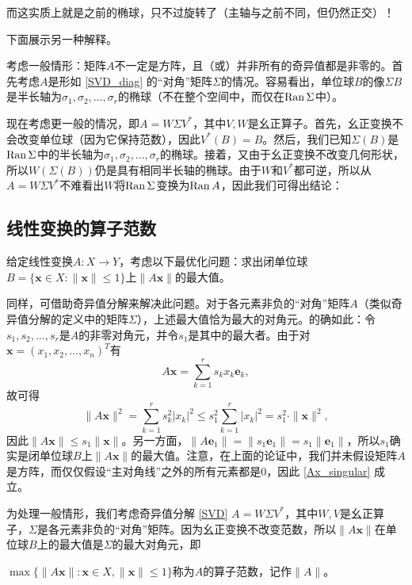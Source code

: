 而这实质上就是之前的椭球，只不过旋转了（主轴与之前不同，但仍然正交）！

下面展示另一种解释。

考虑一般情形：矩阵$A$不一定是方阵，且（或）并非所有的奇异值都是非零的。首先考虑$A$是形如 \eqref{SVD_diag} 的“对角”矩阵$\Sigma$的情况。容易看出，单位球$B$的像$\Sigma B$是半长轴为$\sigma_1,\sigma_2,\dots,\sigma_r$的椭球（不在整个空间中，而仅在$\operatorname{Ran} \Sigma$中）。

现在考虑更一般的情况，即$A=W\Sigma V^*$，其中$V,W$是幺正算子。首先，幺正变换不会改变单位球（因为它保持范数），因此$V^*(B)=B$。然后，我们已知$\Sigma (B)$是$\operatorname{Ran} \Sigma$中的半长轴为$\sigma_1,\sigma_2,\dots,\sigma_r$的椭球。接着，又由于幺正变换不改变几何形状，所以$W(\Sigma(B))$仍是具有相同半长轴的椭球。由于$W$和$V^*$都可逆，所以从$A=W\Sigma V^*$不难看出$W$将$\operatorname{Ran} \Sigma$变换为$\operatorname{Ran} A$，因此我们可得出结论：
\begin{center}
\end{center}

\subsection{线性变换的算子范数}

给定线性变换$A:X\to Y$，考虑以下最优化问题：求出闭单位球$B=\{\mathbf{x}\in X:\|\mathbf{x}\|\le 1\}$上$\|A\mathbf{x}\|$的最大值。

同样，可借助奇异值分解来解决此问题。对于各元素非负的“对角”矩阵$A$（类似奇异值分解的定义中的矩阵$\Sigma$），上述最大值恰为最大的对角元。的确如此：令$s_1,s_2,\ldots,s_r$是$A$的非零对角元，并令$s_1$是其中的最大者。由于对$\mathbf{x}=(x_1,x_2,\ldots,x_n)^T$有
\begin{equation}\label{Ax_singular}
    A\mathbf{x}=\sum_{k=1}^rs_kx_k\mathbf{e}_k,
\end{equation}
故可得
\[\|A\mathbf{x}\|^{2}=\sum_{k=1}^{r}s_{k}^{2}|x_{k}|^{2}\leq s_{1}^{2}\sum_{k=1}^{r}|x_{k}|^{2}=s_{1}^{2}\cdot\|\mathbf{x}\|^{2},\]
因此$\|A\mathbf{x}\|\le s_1\|\mathbf{x}\|$。另一方面，$\|A\mathbf{e}_{1}\|=\|s_{1}\mathbf{e}_{1}\|=s_{1}\|\mathbf{e}_{1}\|$，所以$s_1$确实是闭单位球$B$上$\|A\mathbf{x}\|$的最大值。注意，在上面的论证中，我们并未假设矩阵$A$是方阵，而仅仅假设“主对角线”之外的所有元素都是$0$，因此 \eqref{Ax_singular} 成立。

为处理一般情形，我们考虑奇异值分解 \eqref{SVD} $A=W\Sigma V^*$，其中$W,V$是幺正算子，$\Sigma$是各元素非负的“对角”矩阵。因为幺正变换不改变范数，所以$\|A\mathbf{x}\|$在单位球$B$上的最大值是$\Sigma$的最大对角元，即
\begin{center}
\end{center}
\begin{definition*}
    $\max\{\|A\mathbf{x}\|:\mathbf{x}\in X,\|\mathbf{x}\|\le 1\}$称为$A$的算子范数，记作$\|A\|$。
\end{definition*}

